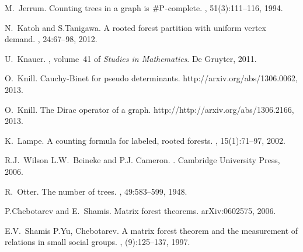 \documentclass[12pt]{amsart}
\theoremstyle{definition}
\begin{document}
\begin{thebibliography}{10}
M.~Jerrum.
\newblock Counting trees in a graph is {$\#{\rm P}$}-complete.
, 51(3):111--116, 1994.

N.~Katoh and S.Tanigawa.
\newblock A rooted forest partition with uniform vertex demand.
, 24:67--98, 2012.

U.~Knauer.
, volume~41 of {\em Studies in
  Mathematics}.
\newblock De Gruyter, 2011.

O.~Knill.
\newblock Cauchy-{B}inet for pseudo determinants.
\newblock {\\}http://arxiv.org/abs/1306.0062, 2013.

O.~Knill.
\newblock The {D}irac operator of a graph.
\newblock {\\}http://http://arxiv.org/abs/1306.2166, 2013.

K.~Lampe.
\newblock A counting formula for labeled, rooted forests.
, 15(1):71--97, 2002.

R.J.~Wilson L.W.~Beineke and P.J. Cameron.
.
\newblock Cambridge University Press, 2006.

R.~Otter.
\newblock The number of trees.
, 49:583--599, 1948.

P.Chebotarev and E.~Shamis.
\newblock Matrix forest theorems.
\newblock arXiv:0602575, 2006.

E.V.~Shamis P.Yu, Chebotarev.
\newblock A matrix forest theorem and the measurement of relations in small
  social groups.
, (9):125--137, 1997.

\end{thebibliography}
\end{document}
